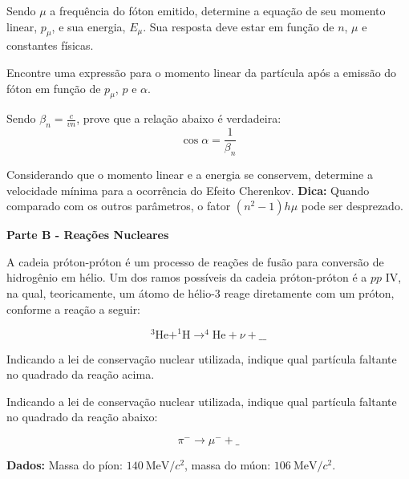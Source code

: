 \documentclass[11pt]{article}
\begin{document}
\begin{pproblem}
    \begin{alternativas}
        \item Sendo $\mu$ a frequência do fóton emitido, determine a equação de seu momento
        linear, $p_\mu$, e sua energia, $E_\mu$. Sua resposta deve estar em função de $n$, $\mu$ e constantes físicas.
        \item Encontre uma expressão para o momento linear da partícula após a emissão
    do fóton em função de $p_\mu$, $p$ e $\alpha$.
        \item Sendo $\beta_n = \frac{c}{vn}$, prove que a relação abaixo é verdadeira:
        \begin{equation}
            \cos\alpha = \frac{1}{\beta_n}
        \end{equation}
        \item Considerando que o momento linear e a energia se conservem, determine a
        velocidade mínima para a ocorrência do Efeito Cherenkov.
        \textbf{Dica:} Quando comparado com os outros parâmetros, o fator $(n^2-1)h\mu$ pode ser desprezado.

    \begin{center}
        \textbf{Parte B - Reações Nucleares}    
    \end{center}
    
    A cadeia próton-próton é um processo de reações de fusão para conversão de hidrogênio em hélio.
    Um dos ramos possíveis da cadeia próton-próton é a $pp \text{ IV}$, na qual, teoricamente, um átomo de
    hélio-3 reage diretamente com um próton, conforme a reação a seguir:

    \begin{equation}
        ^3\text{He} + ^1\text{H} \rightarrow ^4\text{He} + \nu + \_\_
    \end{equation}

        \item  Indicando a lei de conservação nuclear utilizada, indique qual partícula faltante
        no quadrado da reação acima.

        \item  Indicando a lei de conservação nuclear utilizada, indique qual partícula faltante
        no quadrado da reação abaixo:

        \begin{equation}
            \pi^- \rightarrow \mu^- + \_
        \end{equation}
        
        \textbf{Dados:} Massa do píon: $140 \ \text{MeV}/c^2$, massa do múon: $106 \ \text{MeV}/c^2$.
    \end{alternativas}


\end{pproblem}
\end{document}
